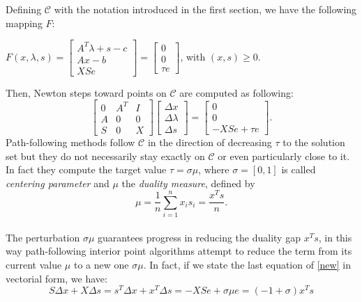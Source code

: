 \documentclass[a4paper,10 pt,titlepage,twoside]{book}
\theoremstyle{plain}
\theoremstyle{definition}
\theoremstyle{remark}
\begin{document}
 
 Defining $\mathcal{C}$ with the notation introduced in the first section, we have the following mapping $\mathit{F}$:
 \begin{center}
 	$\mathit{F}(x,\lambda,s)= \begin{bmatrix}
 	A^{T}\lambda+s-c \\Ax-b \\XSe
 	\end{bmatrix}=\begin{bmatrix} 0\\0\\ \tau e \end{bmatrix}$, with $(x,s)\geq0$.
 \end{center}
Then, Newton steps toward points on $\mathcal{C}$ are computed as following:
 \begin{equation}\label{new}
 \begin{bmatrix}
 0&A^{T}&I \\A&0&0\\S&0&X
 \end{bmatrix}\begin{bmatrix}
 \Delta x\\\Delta\lambda \\\Delta s
 \end{bmatrix}=\begin{bmatrix}
 0\\0\\-XSe + \tau e
 \end{bmatrix}.
 \end{equation}
 Path-following methods follow $\mathcal{C}$ in the direction of decreasing $\tau$ to the solution set but they do not necessarily stay exactly on $\mathcal{C}$ or even particularly close to it. In fact they compute the target value $\tau = \sigma \mu$, where $\sigma = [0,1]$ is called \textit{centering parameter} and $\mu$ the \textit{duality measure}, defined by
 \begin{equation*}
 \mu = \frac{1}{n}\sum_{i=1}^{n} x_{i}s_{i} = \frac{x^{T}s}{n}.
 \end{equation*}\\
 The perturbation $\sigma\mu$ guarantees progress in reducing the duality gap $x^{T}s$,
 in this way path-following interior point algorithms attempt to reduce the term from
 its current value $\mu$ to a new one $\sigma\mu$. In fact, if we state the last equation of \ref{new} in vectorial form, we have:
 \begin{equation}
 S\Delta x + X\Delta s = s^{T}\Delta x + x^{T}\Delta s = - XSe + \sigma \mu e = (-1 + \sigma)x^{T}s
 \end{equation}
\end{document}
